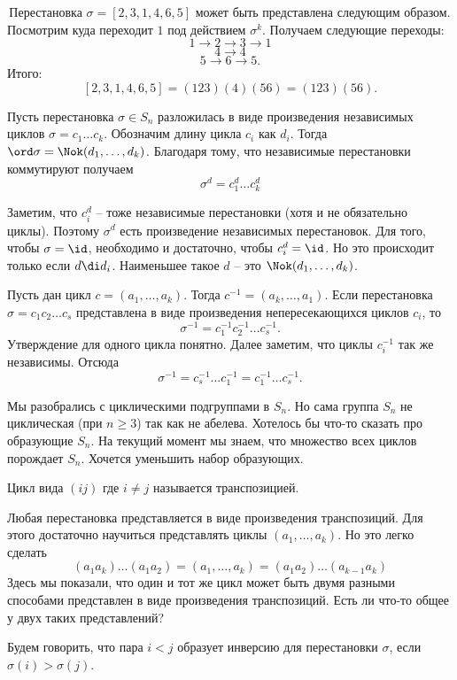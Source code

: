 \exm \,Перестановка $\sigma=[2,3,1,4,6,5]$ может быть представлена следующим образом. Посмотрим куда переходит $1$ под действием $\sigma^k$. Получаем следующие переходы:
$$1\to 2\to 3 \to 1$$ 
$$4 \to 4 $$
$$ 5\to 6\to 5.$$
Итого: 
$$[2,3,1,4,6,5]=(123)(4)(56)=(123)(56).$$

\utv Пусть перестановка $\sigma \in S_n$ разложилась в виде произведения  независимых циклов $\sigma=c_1\dots c_k$. Обозначим длину цикла $c_i$  как $d_i$. Тогда $\ord \sigma= \Nok(d_1,\dots,d_k)$.
\eutv
\proof Благодаря тому, что независимые перестановки коммутируют получаем
$$\sigma^d=c_1^d\dots c_k^d$$

Заметим, что $c_i^d$ -- тоже независимые перестановки (хотя и не обязательно циклы). Поэтому $\sigma^d$  есть произведение независимых перестановок. Для того, чтобы $\sigma =\id$, необходимо и достаточно, чтобы $c_i^d=\id$. Но это происходит только если $d\di d_i$. Наименьшее такое $d$ -- это $\Nok(d_1,\dots,d_k)$.
\endproof

 Пусть дан цикл $c=(a_1,\dots,a_k)$. Тогда $c^{-1}=(a_k,\dots,a_1)$. Если перестановка   $\sigma= c_1c_2\dots c_s$ представлена в виде произведения непересекающихся циклов $c_i$, то
$$\sigma^{-1}=c_1^{-1}c_2^{-1}\dots c_s^{-1}.$$
\eutv
\proof Утверждение для одного цикла понятно. Далее заметим, что циклы $c_i^{-1}$ так же независимы. Отсюда
$$\sigma^{-1}=c_s^{-1}\dots c_1^{-1}=c_1^{-1}\dots c_s^{-1}.$$
\endproof



Мы разобрались с циклическими подгруппами в $S_n$. Но сама группа $S_n$ не циклическая (при $n\geq 3$) так как не абелева. Хотелось бы что-то сказать про образующие $S_n$. На текущий момент мы знаем, что множество всех циклов порождает $S_n$. Хочется уменьшить набор образующих.

\dfn[Транспозиция] Цикл вида $(ij)$ где $i\neq j$ называется транспозицией.
\edfn

\utv Любая перестановка представляется в виде произведения транспозиций.
\eutv
\proof Для этого достаточно научиться представлять циклы $(a_1,\dots,a_k)$. Но это легко сделать
$$(a_1 a_k)\dots( a_1 a_2)=(a_1,\dots,a_k)=(a_1a_2)\dots (a_{k-1} a_k)$$
\endproof
Здесь мы показали, что один и тот же цикл может быть двумя разными способами представлен в виде произведения транспозиций. Есть ли что-то общее у двух таких представлений?

\dfn[Инверсия] Будем говорить, что пара $i<j$  образует инверсию для перестановки $\sigma$, если $\sigma(i)>\sigma(j)$.
\edfn

